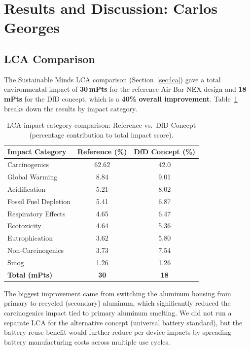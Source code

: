 \section{Results and Discussion: Carlos Georges}
\label{sec:results}

\subsection{LCA Comparison}

The Sustainable Minds LCA comparison (Section~\ref{sec:lca}) gave a total environmental impact of \textbf{30\,mPts} for the reference Air Bar NEX design and \textbf{18\,mPts} for the DfD concept, which is a \textbf{40\% overall improvement}. Table~\ref{tab:lca_results} breaks down the results by impact category.

\begin{table}[H]
\centering
\caption{LCA impact category comparison: Reference vs.\ DfD Concept (percentage contribution to total impact score).}
\label{tab:lca_results}
\begin{tabular}{@{}lcc@{}}
\toprule
\textbf{Impact Category} & \textbf{Reference (\%)} & \textbf{DfD Concept (\%)} \\
\midrule
Carcinogenics              & 62.62 & 42.0 \\
Global Warming             & 8.84  & 9.01 \\
Acidification              & 5.21  & 8.02 \\
Fossil Fuel Depletion      & 5.41  & 6.87 \\
Respiratory Effects        & 4.65  & 6.47 \\
Ecotoxicity                & 4.64  & 5.36 \\
Eutrophication             & 3.62  & 5.80 \\
Non-Carcinogenics          & 3.73  & 7.54 \\
Smog                       & 1.26  & 1.26 \\
\midrule
\textbf{Total (mPts)}     & \textbf{30}  & \textbf{18} \\
\bottomrule
\end{tabular}
\end{table}

The biggest improvement came from switching the aluminum housing from primary to recycled (secondary) aluminum, which significantly reduced the carcinogenics impact tied to primary aluminum smelting. We did not run a separate LCA for the alternative concept (universal battery standard), but the battery-reuse benefit would further reduce per-device impacts by spreading battery manufacturing costs across multiple use cycles.

